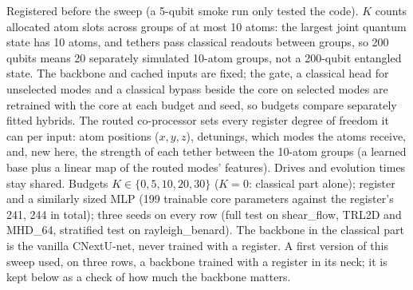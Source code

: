 \documentclass{article}
\begin{document}
Registered before the sweep (a 5-qubit smoke run only tested the code). $K$ counts allocated atom slots across groups of
at most 10 atoms: the largest joint quantum state has 10 atoms, and tethers pass classical readouts between groups, so
200 qubits means 20 separately simulated 10-atom groups, not a 200-qubit entangled state. The backbone and cached inputs are fixed; the gate, a classical head for unselected modes and a classical bypass beside
the core on selected modes are retrained with the core at each budget and seed, so budgets compare separately fitted hybrids. The routed co-processor sets every register degree of freedom it can per input: atom
positions ($x,y,z$), detunings, which modes the atoms receive, and, new here, the strength of each tether between the
10-atom groups (a learned base plus a linear map of the routed modes' features). Drives and evolution times stay
shared. Budgets $K\in\{0,5,10,20,30\}$ ($K=0$: classical part alone); register and a similarly sized MLP (199 trainable core parameters against the register's 241, 244 in total); three seeds on
every row (full test on shear\_flow, TRL2D and MHD\_64, stratified test on rayleigh\_benard). The backbone in the classical
part is the vanilla CNextU-net, never trained with a register. A first version of this sweep used, on three rows, a backbone
trained with a register in its neck; it is kept below as a check of how much the backbone matters.
\end{document}
